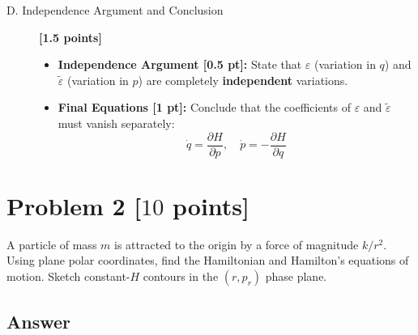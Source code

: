 \documentclass[11pt, a4paper]{article} %
\begin{document}
\begin{description}
    \item[D. Independence Argument and Conclusion] \hfill \textbf{[1.5 points]}
    \begin{itemize}
        \item \textbf{Independence Argument [0.5 pt]:} State that $\varepsilon$ (variation in $q$) and $\tilde{\varepsilon}$ (variation in $p$) are completely \textbf{independent} variations.
        \item \textbf{Final Equations [1 pt]:} Conclude that the coefficients of $\varepsilon$ and $\tilde{\varepsilon}$ must vanish separately:
        $$ \dot{q} = \frac{\partial H}{\partial p}, \quad \dot{p} = -\frac{\partial H}{\partial q} $$
    \end{itemize}
\end{description}

\newpage 
\section*{Problem 2 [$10$ points]} 
A particle of mass $m$ is attracted to the origin by a force of magnitude $k/r^2$. Using plane polar coordinates, find the Hamiltonian and Hamilton's equations of motion. Sketch constant-$H$ contours in the $(r,p_r)$ phase plane.

\subsection*{Answer}
\end{document}
